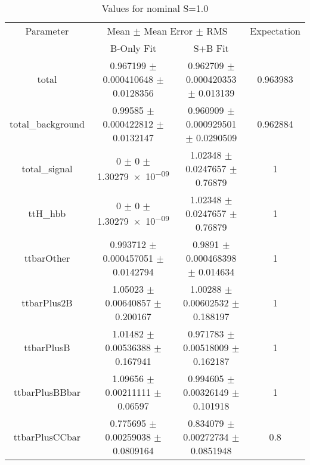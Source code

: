 \begin{table}
\centering
\caption{Values for nominal S=1.0}
\begin{tabular}{cccc}
\toprule
Parameter & \multicolumn{2}{c}{Mean $\pm$ Mean Error $\pm$ RMS} & Expectation\\
 & B-Only Fit & S+B Fit & \\
\midrule
total & \num{0.967199} $\pm$ \num{0.000410648} $\pm$ \num{0.0128356} & \num{0.962709} $\pm$ \num{0.000420353} $\pm$ \num{0.013139} & \num{0.963983}\\
total\_background & \num{0.99585} $\pm$ \num{0.000422812} $\pm$ \num{0.0132147} & \num{0.960909} $\pm$ \num{0.000929501} $\pm$ \num{0.0290509} & \num{0.962884}\\
total\_signal & \num{0} $\pm$ \num{0} $\pm$ \num{1.30279e-09} & \num{1.02348} $\pm$ \num{0.0247657} $\pm$ \num{0.76879} & \num{1}\\
ttH\_hbb & \num{0} $\pm$ \num{0} $\pm$ \num{1.30279e-09} & \num{1.02348} $\pm$ \num{0.0247657} $\pm$ \num{0.76879} & \num{1}\\
ttbarOther & \num{0.993712} $\pm$ \num{0.000457051} $\pm$ \num{0.0142794} & \num{0.9891} $\pm$ \num{0.000468398} $\pm$ \num{0.014634} & \num{1}\\
ttbarPlus2B & \num{1.05023} $\pm$ \num{0.00640857} $\pm$ \num{0.200167} & \num{1.00288} $\pm$ \num{0.00602532} $\pm$ \num{0.188197} & \num{1}\\
ttbarPlusB & \num{1.01482} $\pm$ \num{0.00536388} $\pm$ \num{0.167941} & \num{0.971783} $\pm$ \num{0.00518009} $\pm$ \num{0.162187} & \num{1}\\
ttbarPlusBBbar & \num{1.09656} $\pm$ \num{0.00211111} $\pm$ \num{0.06597} & \num{0.994605} $\pm$ \num{0.00326149} $\pm$ \num{0.101918} & \num{1}\\
ttbarPlusCCbar & \num{0.775695} $\pm$ \num{0.00259038} $\pm$ \num{0.0809164} & \num{0.834079} $\pm$ \num{0.00272734} $\pm$ \num{0.0851948} & \num{0.8}\\
\bottomrule
\end{tabular}
\end{table}